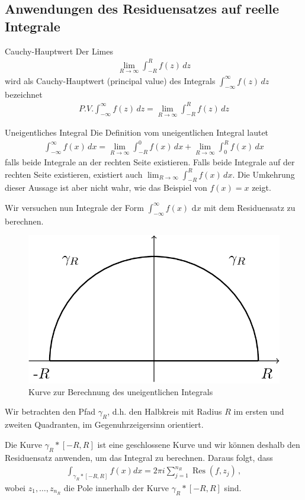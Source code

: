 \documentclass[a4paper,10pt]{article}
\def\dx{\text{ d}x}
\begin{document}
\subsection{Anwendungen des Residuensatzes auf reelle Integrale}

\begin{subbox}{Cauchy-Hauptwert}
  Der Limes \begin{align*} \lim_{R\to\infty}\int_{-R}^Rf(z)\,dz \end{align*} wird als Cauchy-Hauptwert (principal value) des Integrals \(\int_{-\infty}^\infty f(z)\,dz\) bezeichnet \begin{align*} P.V.\int_{-\infty}^\infty f(z)\,dz=\lim_{R\to\infty}\int_{-R}^Rf(z)\,dz \end{align*}
\end{subbox}

\begin{subbox}{Uneigentliches Integral}
  Die Definition vom uneigentlichen Integral lautet \begin{align*} \int_{-\infty}^\infty f(x)\,dx=\lim_{R\to\infty}\int_{-R}^0f(x)\,dx+\lim_{R\to\infty}\int_{0}^Rf(x)\,dx \end{align*} falls beide Integrale an der rechten Seite existieren. Falls beide Integrale auf der rechten Seite existieren, existiert auch \(\lim_{R\to\infty}\int_{-R}^Rf(x)\,dx\). Die Umkehrung dieser Aussage ist aber nicht wahr, wie das Beispiel von \(f(x)=x\) zeigt.
\end{subbox}

Wir versuchen nun Integrale der Form $\int_{-\infty}^\infty f(x) \dx$ mit dem Residuensatz zu berechnen.

\begin{figure}[H]
  \centering 
  \includegraphics[width=0.5\linewidth]{assets/4-4-1.png}
  \caption{Kurve zur Berechnung des uneigentlichen Integrals}
\end{figure}

Wir betrachten den Pfad $\gamma_R$, d.h. den Halbkreis mit Radius $R$ im ersten und zweiten Quadranten, im Gegenuhrzeigersinn orientiert.

Die Kurve \(\gamma_R\ast[-R,R]\) ist eine geschlossene Kurve und wir können deshalb den Residuensatz anwenden, um das Integral zu berechnen. Daraus folgt, dass 
\begin{align*} \int_{\gamma_R\ast[-R,R]} f(x) dx=2\pi i\sum_{j=1}^{n_R}\operatorname{Res}(f,z_j)\,, \end{align*} 
wobei \(z_1,\dots, z_{n_R}\) die Pole innerhalb der Kurve \(\gamma_R\ast[-R,R]\) sind.
\end{document}
